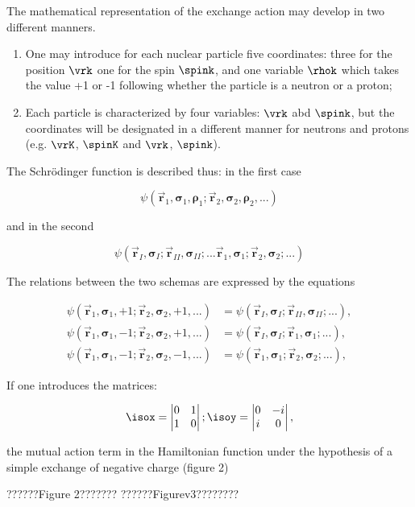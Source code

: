 \documentclass{article}
\newcommand{\var}[1]{\pmb{#1}}
\newcommand{\comp}[1]{{#1}}
\newcommand{\vect}[1]{\vec{\var{#1}}}
\newcommand{\vrX}[1]{\vect{r}_{\comp{#1}}}
\newcommand{\rhoX}[1]{\var{\rho}_{\comp{#1}}}
\newcommand{\spinX}[1]{\var{\sigma}_{\comp{#1}}}
\newcommand{\nequ}[2]{
\begin{equation*}
#1
\tag{#2}
\end{equation*}
}
\newcommand{\uequ}[1]{
\begin{equation*}
#1
\end{equation*}
}
\begin{document}
The mathematical representation of the exchange action may develop in two different manners.
\begin{enumerate}
    \item One may introduce for each nuclear particle five coordinates: three for the position $\vrk$ one for the spin $\spink$, and one variable $\rhok$ which takes the value +1 or -1 following whether the particle is a neutron or a proton;
    \item Each particle is characterized by four variables: $\vrk$ abd $\spink$, but the coordinates will be designated in a different manner for neutrons and protons (e.g. $\vrK$, $\spinK$ and $\vrk$, $\spink$).
\end{enumerate}

The Schrödinger function is described thus: in the first case

\uequ{
\psi(\vrX{1}, \spinX{1}, \rhoX{1}; \vrX{2}, \spinX{2}, \rhoX{2}, ...)
}

and in the second

\uequ{
\psi(\vrX{I}, \spinX{I}; \vrX{II}, \spinX{II}; ... \vrX{1}, \spinX{1}; \vrX{2}, \spinX{2}; ... )
}

The relations between the two schemas are expressed by the equations

\nequ{
\begin{split}
\psi(\vrX{1}, \spinX{1}, +1; \vrX{2}, \spinX{2}, +1, ...) &= \psi(\vrX{I}, \spinX{I}; \vrX{II}, \spinX{II}; ...),\\
\psi(\vrX{1}, \spinX{1}, -1; \vrX{2}, \spinX{2}, +1, ...) &= \psi(\vrX{I}, \spinX{I}; \vrX{1}, \spinX{1}; ...),\\
\psi(\vrX{1}, \spinX{1}, -1; \vrX{2}, \spinX{2}, -1, ...) &= \psi(\vrX{1}, \spinX{1}; \vrX{2}, \spinX{2}; ...),
\end{split}
}{9}

If one introduces the matrices:

\uequ{
\isox = \begin{vmatrix}
 0 & 1\\
 1 & 0
\end{vmatrix};
\isoy = \begin{vmatrix}
0 & -i\\
i & 0
\end{vmatrix},
}

the mutual action term in the Hamiltonian function under the hypothesis of a simple exchange of negative charge (figure 2)

??????Figure 2???????
??????Figurev3????????
\end{document}
